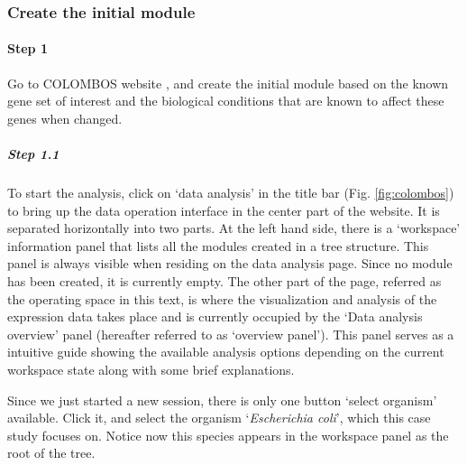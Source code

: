 \subsubsection{Create the initial module}

\begin{small} %

\paragraph{Step 1} 
Go to COLOMBOS website \cite{COLOMBOS}, and create the initial module based on
the known gene set of interest and the biological conditions that are known to
affect these genes when changed.

\subparagraph{Step 1.1}	To start the analysis, click on `data 
analysis' in the title bar (Fig. \ref{fig:colombos}) to bring up the data
operation interface in the center part of the website.  It is separated
horizontally into two parts. At the left hand side, there is a `workspace'
information panel that lists all the modules created in a tree structure. This
panel is always visible when residing on the data analysis page.
Since no module has been created, it is currently empty.
%
The other part of the page, referred as the operating space in this text, is
where the visualization and analysis of the expression data takes place and is
currently occupied by the `Data analysis overview' panel (hereafter referred to
as `overview panel'). This panel serves as a intuitive guide showing the
available analysis options depending on the current workspace state along with
some brief explanations.


Since we just started a new session, there is only one button `select organism'
available. Click it, and select the organism `\textit{Escherichia coli}', which
this case study focuses on. Notice now this species appears in the workspace
panel as the root of the tree.



\end{small}
